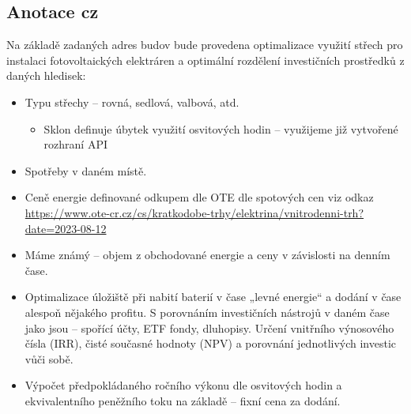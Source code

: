 \documentclass[a4paper, 12pt]{article}
\begin{document}
\subsection*{Anotace cz}
Na základě zadaných adres budov bude provedena optimalizace využití střech pro instalaci fotovoltaických elektráren a optimální rozdělení investičních prostředků z daných hledisek:
\begin{itemize}

    \item Typu střechy – rovná, sedlová, valbová, atd.
    \begin{itemize}
        \item Sklon definuje úbytek využití osvitových hodin – využijeme již vytvořené rozhraní API
    \end{itemize}
    \item Spotřeby v daném místě.
    \item Ceně energie definované odkupem dle OTE dle spotových cen viz odkaz \url{https://www.ote-cr.cz/cs/kratkodobe-trhy/elektrina/vnitrodenni-trh?date=2023-08-12}
    \item Máme známý – objem z obchodované energie a ceny v závislosti na denním čase.
    \item Optimalizace úložiště při nabití baterií v čase „levné energie“ a dodání v čase alespoň nějakého profitu. S porovnáním investičních nástrojů v daném čase jako jsou – spořící účty, ETF fondy, dluhopisy. Určení vnitřního výnosového čísla (IRR), čisté současné hodnoty (NPV) a porovnání jednotlivých investic vůči sobě.
    \item Výpočet předpokládaného ročního výkonu dle osvitových hodin a ekvivalentního peněžního toku na základě – fixní cena za dodání.

\end{itemize}
\end{document}
